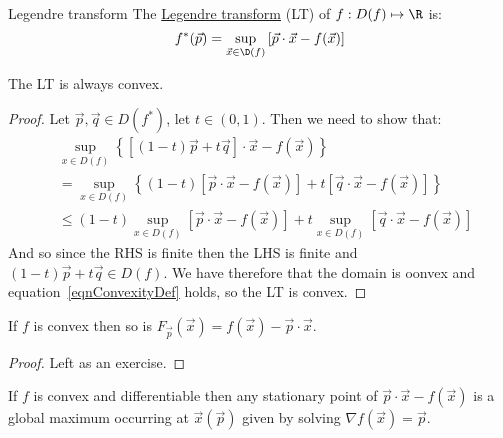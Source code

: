\documentclass[../Main.tex]{subfiles}
\begin{document}
\begin{definition}{Legendre transform}
    The \underline{Legendre transform} (LT) of $f : D(f) \mapsto \R$ is:
    \begin{equation}
        f^*(\vec{p}) = \sup_{\vec{x} \in \D(f)} \left[\vec{p} \cdot \vec{x} - f(\vec{x})\right]
        \label{eqnLT}
    \end{equation}
\end{definition}
\begin{proposition}
    The LT is always convex.
    \label{propLTConvex}
\end{proposition}
\begin{proof}
    Let $\vec{p}, \vec{q} \in D(f^*)$, let $t \in (0, 1)$. Then we need to show that:
    \begin{align*}
        &\sup_{x \in D(f)} \left\{\left[(1 - t)\vec{p} + t\vec{q}\right] \cdot \vec{x} - f(\vec{x})\right\} \\
        &= \sup_{x \in D(f)} \left\{(1-t)\left[\vec{p} \cdot \vec{x} - f(\vec{x})\right] + t \left[\vec{q} \cdot \vec{x} - f(\vec{x})\right]\right\} \\
        &\leq (1-t) \sup_{x \in D(f)} \left[\vec{p} \cdot \vec{x} - f(\vec{x})\right] + t \sup_{x \in D(f)} \left[\vec{q} \cdot \vec{x} - f(\vec{x})\right]
    \end{align*}
    And so since the RHS is finite then the LHS is finite and $(1-t)\vec{p} + t\vec{q} \in D(f)$. We have therefore that the domain is oonvex and equation~\ref{eqnConvexityDef} holds, so the LT is convex.
\end{proof}
\begin{proposition}
    If $f$ is convex then so is $F_\vec{p}(\vec{x}) = f(\vec{x}) - \vec{p} \cdot \vec{x}$.
\end{proposition}
\begin{proof}
    Left as an exercise.
\end{proof}
\begin{corollary}
    If $f$ is convex and differentiable then any stationary point of $\vec{p} \cdot \vec{x} - f(\vec{x})$ is a global maximum occurring at $\vec{x}(\vec{p})$ given by solving $\nabla f(\vec{x}) = \vec{p}$.
\end{corollary}
\end{document}
